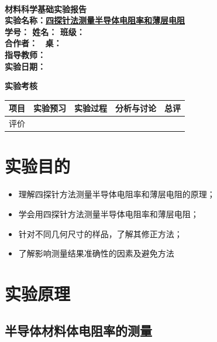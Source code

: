 \documentclass[a4paper,utf8]{article}
\begin{document}
\begin{center}
    {\mbox{}\\[7em]\bfseries\songti%
    材料科学基础实验报告}\\[34mm]
    {\bfseries\songti
    实验名称：\uline{\hfill\mbox{四探针法测量半导体电阻率和薄层电阻}\hfill} \\[2.9mm]
    学\quad 号：\uline{}\hfill
    姓\quad 名：\uline{}\hfill
    班\quad 级：\uline{} \\[2.9mm]
    合作者：\uline{}\enspace~
    桌：\uline{\makebox[25mm]{}}\hfill\mbox{}\\[2.9mm]
    指导教师：\uline{}\hfill\mbox{} \\[2.9mm]
    实验日期：\uline{}\hfill\mbox{} \\[58.7mm]
    } 
    {\bfseries\songti
    实验考核\\[3mm]
    \extrarowheight=3mm
    \begin{tabularx}{150mm}{|X|X|X|X|X|}\hline
        \hfil 项目 \hfil  & \hfil 实验预习 \hfil & \hfil 实验过程 \hfil & \hfil 分析与讨论 \hfil & \hfil 总评 \hfil \\[3mm] \hline
        \hfil 评价 \hfil &  &  &  &  \\[3mm] \hline
    \end{tabularx}
    }
\end{center}\newpage
\section{实验目的}
    \begin{itemize}
        \item 理解四探针方法测量半导体电阻率和薄层电阻的原理；
        \item 学会用四探针方法测量半导体电阻率和薄层电阻；
        \item 针对不同几何尺寸的样品，了解其修正方法；
        \item 了解影响测量结果准确性的因素及避免方法
    \end{itemize}
\section{实验原理}%
    \subsection{半导体材料体电阻率的测量}
\end{document}
